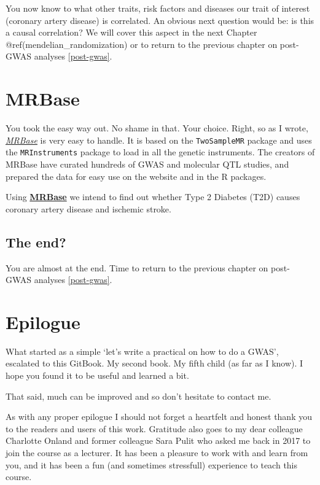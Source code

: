 \documentclass[
]{book}
\begin{document}
You now know to what other traits, risk factors and diseases our trait of interest (coronary artery disease) is correlated. An obvious next question would be: is this a causal correlation? We will cover this aspect in the next Chapter @ref(mendelian\_randomization) or to return to the previous chapter on post-GWAS analyses \ref{post-gwas}.

\hypertarget{mr_mrbase}{%
\chapter{MRBase}\label{mr_mrbase}}

You took the easy way out. No shame in that. Your choice. Right, so as I wrote, \emph{\href{http://www.mrbase.org/}{MRBase}} is very easy to handle. It is based on the \texttt{TwoSampleMR} package and uses the \texttt{MRInstruments} package to load in all the genetic instruments. The creators of MRBase have curated hundreds of GWAS and molecular QTL studies, and prepared the data for easy use on the website and in the R packages.

Using \textbf{\href{http://www.mrbase.org/}{MRBase}} we intend to find out whether Type 2 Diabetes (T2D) causes coronary artery disease and ischemic stroke.

\hypertarget{the-end}{%
\section{The end?}\label{the-end}}

You are almost at the end. Time to return to the previous chapter on post-GWAS analyses \ref{post-gwas}.

\hypertarget{epilogue}{%
\chapter{Epilogue}\label{epilogue}}

What started as a simple `let's write a practical on how to do a GWAS', escalated to this GitBook. My second book. My fifth child (as far as I know). I hope you found it to be useful and learned a bit.

That said, much can be improved and so don't hesitate to contact me.

As with any proper epilogue I should not forget a heartfelt and honest thank you to the readers and users of this work. Gratitude also goes to my dear colleague Charlotte Onland and former colleague Sara Pulit who asked me back in 2017 to join the course as a lecturer. It has been a pleasure to work with and learn from you, and it has been a fun (and sometimes stressfull) experience to teach this course.
\end{document}
